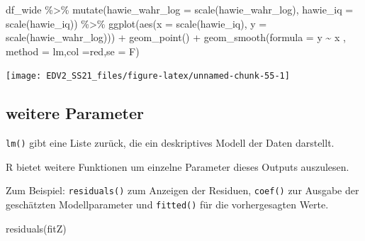 \documentclass[
]{book}
\newenvironment{Shaded}{\begin{snugshade}}{\end{snugshade}}
\newcommand{\AttributeTok}[1]{\textcolor[rgb]{0.77,0.63,0.00}{#1}}
\newcommand{\FunctionTok}[1]{\textcolor[rgb]{0.00,0.00,0.00}{#1}}
\newcommand{\NormalTok}[1]{#1}
\newcommand{\SpecialCharTok}[1]{\textcolor[rgb]{0.00,0.00,0.00}{#1}}
\newcommand{\StringTok}[1]{\textcolor[rgb]{0.31,0.60,0.02}{#1}}
\begin{document}
\begin{Shaded}
\begin{Highlighting}[]
\NormalTok{df\_wide }\SpecialCharTok{\%\textgreater{}\%} 
  \FunctionTok{mutate}\NormalTok{(}\AttributeTok{hawie\_wahr\_log =} \FunctionTok{scale}\NormalTok{(hawie\_wahr\_log),}
         \AttributeTok{hawie\_iq =} \FunctionTok{scale}\NormalTok{(hawie\_iq)) }\SpecialCharTok{\%\textgreater{}\%} 
  \FunctionTok{ggplot}\NormalTok{(}\FunctionTok{aes}\NormalTok{(}\AttributeTok{x =} \FunctionTok{scale}\NormalTok{(hawie\_iq), }
                      \AttributeTok{y =} \FunctionTok{scale}\NormalTok{(hawie\_wahr\_log))) }\SpecialCharTok{+}
    \FunctionTok{geom\_point}\NormalTok{() }\SpecialCharTok{+}
    \FunctionTok{geom\_smooth}\NormalTok{(}\AttributeTok{formula =}\NormalTok{  y }\SpecialCharTok{\textasciitilde{}}\NormalTok{ x ,}
                \AttributeTok{method =} \StringTok{\textquotesingle{}lm\textquotesingle{}}\NormalTok{,}\AttributeTok{col =}\StringTok{\textquotesingle{}red\textquotesingle{}}\NormalTok{,}\AttributeTok{se =}\NormalTok{ F)}
\end{Highlighting}
\end{Shaded}

\begin{center}\texttt{[image: EDV2\_SS21\_files/figure-latex/unnamed-chunk-55-1]} \end{center}

\hypertarget{weitere-parameter}{%
\subsection{weitere Parameter}\label{weitere-parameter}}

\texttt{lm()} gibt eine Liste zurück, die ein deskriptives Modell der Daten darstellt.

R bietet weitere Funktionen um einzelne Parameter dieses Outputs auszulesen.

Zum Beispiel:
\texttt{residuals()} zum Anzeigen der Residuen, \texttt{coef()} zur Ausgabe der geschätzten Modellparameter und \texttt{fitted()} für die vorhergesagten Werte.

\begin{Shaded}
\begin{Highlighting}[]
\FunctionTok{residuals}\NormalTok{(fitZ)}
\end{Highlighting}
\end{Shaded}
\end{document}
